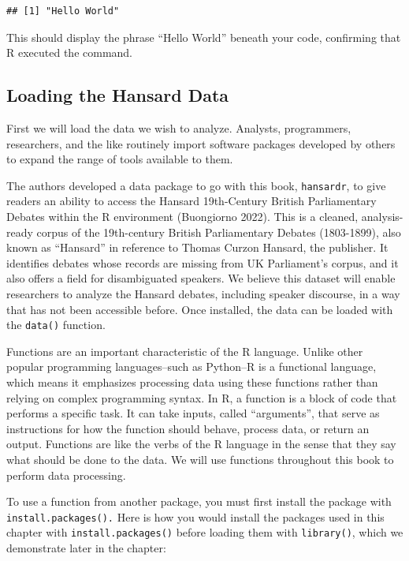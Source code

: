 \documentclass[
]{article}
\begin{document}
\begin{verbatim}
## [1] "Hello World"
\end{verbatim}

This should display the phrase ``Hello World'' beneath your code,
confirming that R executed the command.

\subsection{Loading the Hansard Data}\label{loading-the-hansard-data}

First we will load the data we wish to analyze. Analysts, programmers,
researchers, and the like routinely import software packages developed
by others to expand the range of tools available to them.

The authors developed a data package to go with this book,
\texttt{hansardr}, to give readers an ability to access the Hansard
19th-Century British Parliamentary Debates within the R environment
(Buongiorno 2022). This is a cleaned, analysis-ready corpus of the
19th-century British Parliamentary Debates (1803-1899), also known as
``Hansard'' in reference to Thomas Curzon Hansard, the publisher. It
identifies debates whose records are missing from UK Parliament's
corpus, and it also offers a field for disambiguated speakers. We
believe this dataset will enable researchers to analyze the Hansard
debates, including speaker discourse, in a way that has not been
accessible before. Once installed, the data can be loaded with the
\texttt{data()} function.

Functions are an important characteristic of the R language. Unlike
other popular programming languages--such as Python--R is a functional
language, which means it emphasizes processing data using these
functions rather than relying on complex programming syntax. In R, a
function is a block of code that performs a specific task. It can take
inputs, called ``arguments'', that serve as instructions for how the
function should behave, process data, or return an output. Functions are
like the verbs of the R language in the sense that they say what should
be done to the data. We will use functions throughout this book to
perform data processing.

To use a function from another package, you must first install the
package with \texttt{install.packages().} Here is how you would install
the packages used in this chapter with \texttt{install.packages()}
before loading them with \texttt{library()}, which we demonstrate later
in the chapter:
\end{document}
